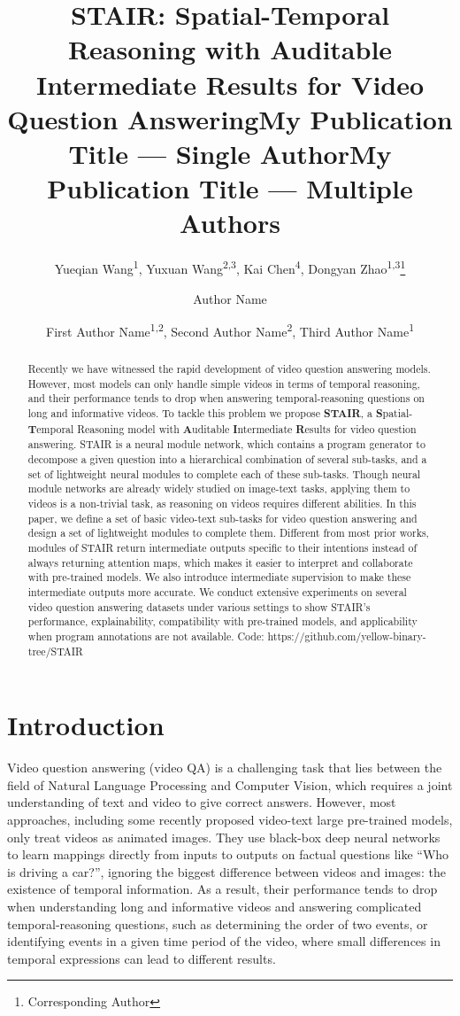 \documentclass[letterpaper]{article} %
\title{STAIR: Spatial-Temporal Reasoning with Auditable Intermediate Results for Video Question Answering}
\author{
    Yueqian Wang\textsuperscript{\rm 1},
    Yuxuan Wang\textsuperscript{\rm 2,3},
    Kai Chen\textsuperscript{\rm 4},
    Dongyan Zhao\textsuperscript{\rm 1,3}\thanks{Corresponding Author}
}
\title{My Publication Title --- Single Author}
\author {
    Author Name
}
\title{My Publication Title --- Multiple Authors}
\author {
    First Author Name\textsuperscript{\rm 1,\rm 2},
    Second Author Name\textsuperscript{\rm 2},
    Third Author Name\textsuperscript{\rm 1}
}
\begin{document}
\maketitle

\begin{abstract}
Recently we have witnessed the rapid development of video question answering models. However, most models can only handle simple videos in terms of temporal reasoning, and their performance tends to drop when answering temporal-reasoning questions on long and informative videos. 
To tackle this problem we propose \textbf{STAIR}, a \textbf{S}patial-\textbf{T}emporal Reasoning model with \textbf{A}uditable \textbf{I}ntermediate \textbf{R}esults for video question answering. STAIR is a neural module network, which contains a program generator to decompose a given question into a hierarchical combination of several sub-tasks, and a set of lightweight neural modules to complete each of these sub-tasks.
Though neural module networks are already widely studied on image-text tasks, applying them to videos is a non-trivial task, as reasoning on videos requires different abilities. In this paper, we define a set of basic video-text sub-tasks for video question answering and design a set of lightweight modules to complete them.
Different from most prior works, modules of STAIR return intermediate outputs specific to their intentions instead of always returning attention maps, which makes it easier to interpret and collaborate with pre-trained models. We also introduce intermediate supervision to make these intermediate outputs more accurate. We conduct extensive experiments on several video question answering datasets under various settings to show STAIR's performance, explainability, compatibility with pre-trained models, and applicability when program annotations are not available. Code: https://github.com/yellow-binary-tree/STAIR
\end{abstract}


\section{Introduction}
Video question answering (video QA) is a challenging task that lies between the field of Natural Language Processing and Computer Vision, which requires a joint understanding of text and video to give correct answers.
However, most approaches, including some recently proposed video-text large pre-trained models, only treat videos as animated images. They use black-box deep neural networks to learn mappings directly from inputs to outputs on factual questions like ``Who is driving a car?'', ignoring the biggest difference between videos and images: the existence of temporal information. As a result, their performance tends to drop when understanding long and informative videos and answering complicated temporal-reasoning questions, such as determining the order of two events, or identifying events in a given time period of the video, where small differences in temporal expressions can lead to different results.
\end{document}
